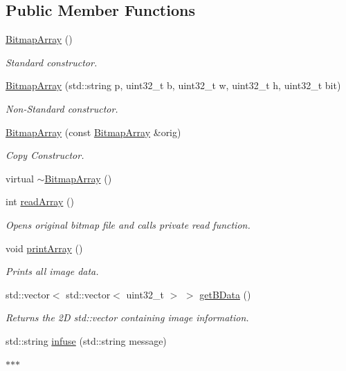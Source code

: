 \subsection*{Public Member Functions}
\begin{DoxyCompactItemize}
\item 
\mbox{\hyperlink{classBitmapArray_a582e5e54ec078d30fde87ae7b4540f32}{Bitmap\+Array}} ()
\begin{DoxyCompactList}\small\item\em Standard constructor. \end{DoxyCompactList}\item 
\mbox{\hyperlink{classBitmapArray_ae080c605889bcde457f82c0b8917749d}{Bitmap\+Array}} (std\+::string p, uint32\+\_\+t b, uint32\+\_\+t w, uint32\+\_\+t h, uint32\+\_\+t bit)
\begin{DoxyCompactList}\small\item\em Non-\/\+Standard constructor. \end{DoxyCompactList}\item 
\mbox{\hyperlink{classBitmapArray_a07ce0273af824a8deff592ef1a43d7e5}{Bitmap\+Array}} (const \mbox{\hyperlink{classBitmapArray}{Bitmap\+Array}} \&orig)
\begin{DoxyCompactList}\small\item\em Copy Constructor. \end{DoxyCompactList}\item 
virtual \mbox{\hyperlink{classBitmapArray_acc21c3148de08fb85d2939821f9f2cf0}{$\sim$\+Bitmap\+Array}} ()
\item 
int \mbox{\hyperlink{classBitmapArray_a4ce4b5acc896040075be63a559799e7e}{read\+Array}} ()
\begin{DoxyCompactList}\small\item\em Opens original bitmap file and calls private read function. \end{DoxyCompactList}\item 
void \mbox{\hyperlink{classBitmapArray_a0580ddeedca7f59fd8d43ec92e6bb4a1}{print\+Array}} ()
\begin{DoxyCompactList}\small\item\em Prints all image data. \end{DoxyCompactList}\item 
std\+::vector$<$ std\+::vector$<$ uint32\+\_\+t $>$ $>$ \mbox{\hyperlink{classBitmapArray_a66bd389c357de601df924569a0b38429}{get\+B\+Data}} ()
\begin{DoxyCompactList}\small\item\em Returns the 2D std\+::vector containing image information. \end{DoxyCompactList}\item 
std\+::string \mbox{\hyperlink{classBitmapArray_a60edd8332724d4eb1ca37c91f0fefdc8}{infuse}} (std\+::string message)
\begin{DoxyCompactList}\small\item\em $\ast$$\ast$$\ast$ \end{DoxyCompactList}\end{DoxyCompactItemize}
